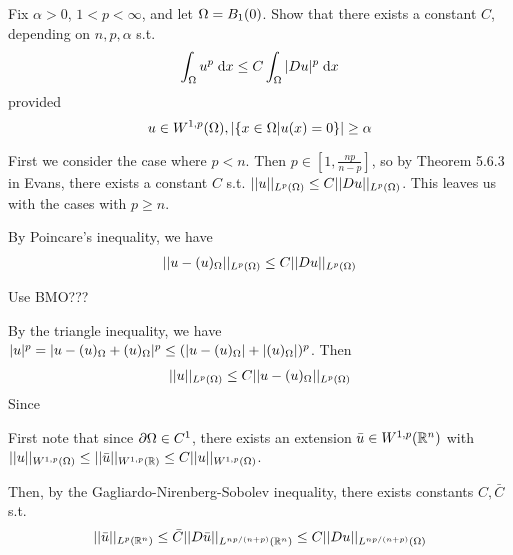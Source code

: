 Fix $\alpha > 0$, $1 < p < \infty$, and let $\Omega = B_1(0)$.
Show that there exists a constant $C$, depending on $n, p, \alpha$ s.t.
$$
\int_\Omega u^p \;\mathrm{d}x \leq C \int_\Omega |D u|^p \;\mathrm{d}x
$$
provided
$$
u \in W^{1, p}(\Omega), |\{ x \in \Omega | u(x) = 0 \}| \geq \alpha
$$

First we consider the case where $p < n$.
Then $p \in \left[1, \frac{n p}{n - p}\right]$, so by Theorem 5.6.3 in Evans, there exists a constant $C$ s.t.
$||u||_{L^p(\Omega)} \leq C ||D u||_{L^p(\Omega)}$.
This leaves us with the cases with $p \geq n$.

By Poincare's inequality, we have
\begin{align*}
||u - (u)_{\Omega}||_{L^p(\Omega)} \leq C ||D u||_{L^p(\Omega)}
\end{align*}

Use BMO???

By the triangle inequality, we have
$|u|^p = |u - (u)_{\Omega} + (u)_{\Omega}|^p \leq (|u - (u)_{\Omega}| + |(u)_{\Omega}|)^p$.
Then
\begin{align*}
||u||_{L^p(\Omega)} \leq C ||u - (u)_{\Omega}||_{L^p(\Omega)}
\end{align*}
Since

First note that since $\partial \Omega \in C^1$, there exists an extension $\bar{u} \in W^{1, p}(\mathbb{R}^n)$
with $||u||_{W^{1, p}(\Omega)} \leq ||\bar{u}||_{W^{1, p}(\mathbb{R})} \leq C ||u||_{W^{1, p}(\Omega)}$.

Then, by the Gagliardo-Nirenberg-Sobolev inequality, there exists constants $C, \bar{C}$ s.t.
\begin{align*}
||\bar{u}||_{L^{p}(\mathbb{R}^n)} \leq \bar{C} ||D \bar{u}||_{L^{n p / (n + p)}(\mathbb{R}^n)} \leq C ||D u||_{L^{n p / (n + p)}(\Omega)}
\end{align*}
